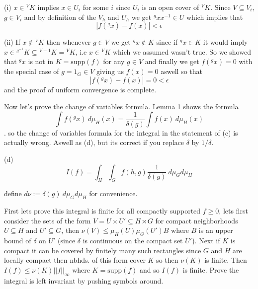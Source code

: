 \documentclass{article}
\begin{document}
\vspace{0.3cm}

(i) $x \in {}^VK$ implies $x \in U_i$ for some $i$ since $U_i$ is an open cover of ${}^VK$. Since $V \subseteq V_i$, $g \in V_i$ and by definition of the $V_h$ and $U_h$ we get ${}^gxx^{-1} \in U$ which implies that $$|f({}^gx) - f(x) | < \epsilon$$

\vspace{0.3cm}

(ii) If $x \not \in {}^VK$ then whenever $g \in V$ we get ${}^gx \not \in K$ since if ${}^gx \in K$ it would imply $x \in {}^{g^{-1}}K \subseteq {}^{V^{}-1}K = {}^VK$, i.e $x \in {}^VK$ which we assumed wasn't true. So we showed that ${}^gx$ is not in $K = \text{supp}(f)$ for any $g \in V$ and finally we get $f(^{g}x) = 0$ with the special case of $g = 1_G \in V$ giving us $f(x) = 0$ aswell so that 
$$|f(^gx) - f(x)| = 0 < \epsilon$$
and the proof of uniform convergence is complete.

\vspace{0.3cm}

Now let's prove the change of variables formula. Lemma 1 shows the formula $$ \int f(^gx) \ d \mu_H(x) = \frac{1}{\delta(g)} \int f(x) \ d\mu_H(x)$$.
so the change of variables formula for the integral in the statement of (c) is actually wrong. Aswell as (d), but its correct if you replace $\delta$ by $1/\delta$.

\vspace{0.3cm}

(d) $$I(f) = \int_H \int_G f(h,g) \frac{1}{\delta(g)} \ d\mu_G d\mu_H$$

define $d\nu := \delta(g) \ d\mu_G d\mu_H$ for convenience.

First lets prove this integral is finite for all compactly supported $f \geq 0$, lets first consider the sets of the form $V = U \times U' \subseteq H \rtimes G$ for compact neighborhoods $U \subseteq H$ and $U' \subseteq G$, then $\nu(V) \leq \mu_H(U)\mu_G(U')B$ where $B$ is an upper bound of $\delta$ on $U'$ (since $\delta$ is continuous on the compact set $U'$). Next if $K$ is compact it can be covered by finitely many such rectangles since $G$ and $H$ are locally compact then nbhds. of this form cover $K$ so then $\nu(K)$ is finite. Then $I(f) \leq \nu(K) ||f||_{\infty}$ where $K = \text{supp}(f)$ and so $I(f)$ is finite. Prove the integral is left invariant by pushing symbols around.
\end{document}

